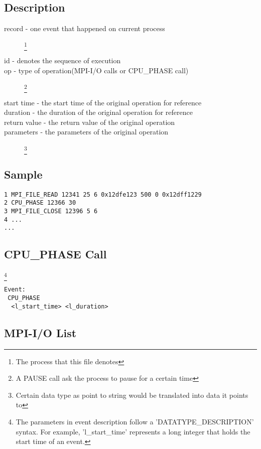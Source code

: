 \documentclass{article}
\begin{document}
\subsection{Description}
\label{sec:Description}
\begin{description}
\item[record - one event that happened on current process]\footnote{The process that this file denotes}
\item[id - denotes the sequence of execution]
\item[op - type of operation(MPI-I/O calls or CPU\_PHASE call)]\footnote{A PAUSE call ask the process to pause for a certain time}
\item[start time - the start time of the original operation for reference]
\item[duration - the duration of the original operation for reference]
\item[return value - the return value of the original operation]
\item[parameters - the parameters of the original operation]\footnote{Certain data type as point to string would be translated into data it points to}
\end{description}

\subsection{Sample}
\label{sec:SampleMPI}
\begin{verbatim}
1 MPI_FILE_READ 12341 25 6 0x12dfe123 500 0 0x12dff1229
2 CPU_PHASE 12366 30
3 MPI_FILE_CLOSE 12396 5 6
4 ...
...
\end{verbatim}

\subsection{CPU\_PHASE Call}\footnote{The parameters in event description follow a 'DATATYPE\_DESCRIPTION' syntax. For example, 'l\_start\_time' represents a long integer that holds the start time of an event.}
\label{sec:CPUPHASECall}
\begin{verbatim}
Event:
 CPU_PHASE 
  <l_start_time> <l_duration>
\end{verbatim}

\subsection{MPI-I/O List}
\label{sec:MPIIOList}
\end{document}
